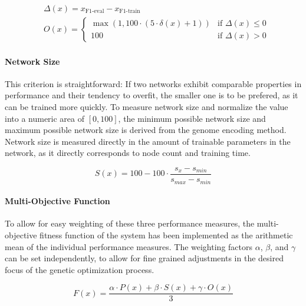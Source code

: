 \documentclass[11pt,a4paper,twoside,openright]{scrbook}
\begin{document}
\begin{equation} %
  \begin{aligned}
    & \Delta(x) = x_{\text{F1-eval}} - x_{\text{F1-train}} \\
    & O(x) = \begin{cases}
      \operatorname{max}(1,100 \cdot (5 \cdot \delta(x) + 1)) & \text{if } \Delta(x) \leq 0 \\
      100 & \text{if } \Delta(x) > 0
    \end{cases}
  \end{aligned}
  \label{eq:overfitting}
\end{equation}

\paragraph{Network Size} This criterion is straightforward: If two networks exhibit comparable properties in performance and their tendency to overfit, the smaller one is to be prefered, as it can be trained more quickly.
To measure network size and normalize the value into a numeric area of \([0,100]\), the minimum possible network size and maximum possible network size is derived from the genome encoding method. Network size is measured directly in the amount of trainable parameters in the network, as it directly corresponds to node count and training time.

\begin{equation}
  S(x) = 100 - 100 \cdot \frac{s_x - s_{min}}{s_{max} - s_{min}}
  \label{eq:cnnsize}
\end{equation}

\paragraph{Multi-Objective Function} To allow for easy weighting of these three performance measures, the multi-objective fitness function of the system has been implemented as the arithmetic mean of the individual performance measures. The weighting factors \(\alpha\), \(\beta\), and \(\gamma\) can be set independently, to allow for fine grained adjustments in the desired focus of the genetic optimization process.

\begin{equation}
  F(x) = \frac{\alpha \cdot P(x) + \beta \cdot S(x) + \gamma \cdot O(x)}{3}
  \label{eq:Fitness}
\end{equation}
\end{document}
